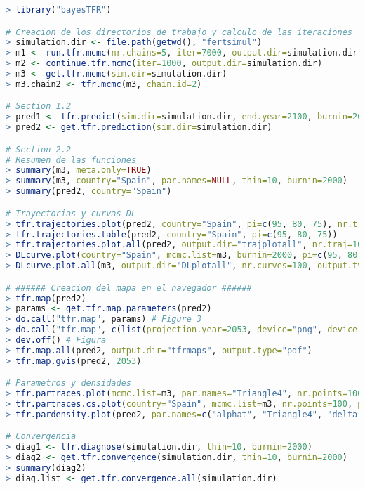 \begin{lstlisting}[language=R, caption=C\'odigo R para modelo de simulaci\'on de fertilidad correspondiente a la sección 2.2]
> library("bayesTFR")

# Creacion de los directorios de trabajo y calculo de las iteraciones
> simulation.dir <- file.path(getwd(), "fertsimul")
> m1 <- run.tfr.mcmc(nr.chains=5, iter=7000, output.dir=simulation.dir, seed=1) # el proceso de iteracion puede llevar varias horas
> m2 <- continue.tfr.mcmc(iter=1000, output.dir=simulation.dir)
> m3 <- get.tfr.mcmc(sim.dir=simulation.dir)
> m3.chain2 <- tfr.mcmc(m3, chain.id=2)

# Section 1.2
> pred1 <- tfr.predict(sim.dir=simulation.dir, end.year=2100, burnin=2000, nr.traj=3000, verbose=TRUE)
> pred2 <- get.tfr.prediction(sim.dir=simulation.dir)

# Section 2.2
# Resumen de las funciones
> summary(m3, meta.only=TRUE)
> summary(m3, country="Spain", par.names=NULL, thin=10, burnin=2000)
> summary(pred2, country="Spain")

# Trayectorias y curvas DL
> tfr.trajectories.plot(pred2, country="Spain", pi=c(95, 80, 75), nr.traj=100) # Figure 2 (left)
> tfr.trajectories.table(pred2, country="Spain", pi=c(95, 80, 75))
> tfr.trajectories.plot.all(pred2, output.dir="trajplotall", nr.traj=100, output.type="pdf", verbose=TRUE)
> DLcurve.plot(country="Spain", mcmc.list=m3, burnin=2000, pi=c(95, 80, 75), nr.curves=100) # Figure 2 (right)
> DLcurve.plot.all(m3, output.dir="DLplotall", nr.curves=100, output.type="pdf", burnin=2000, verbose=TRUE)

# ###### Creacion del mapa en el navegador ######
> tfr.map(pred2)
> params <- get.tfr.map.parameters(pred2)
> do.call("tfr.map", params) # Figure 3
> do.call("tfr.map", c(list(projection.year=2053, device="png", device.args=list(width=1000, file="worldTFR2053.png")), params)); 
> dev.off() # Figura 
> tfr.map.all(pred2, output.dir="tfrmaps", output.type="pdf")
> tfr.map.gvis(pred2, 2053)

# Parametros y densidades
> tfr.partraces.plot(mcmc.list=m3, par.names="Triangle4", nr.points=100) # Figure 5 (left)
> tfr.partraces.cs.plot(country="Spain", mcmc.list=m3, nr.points=100, par.names="Triangle_c4") # Figure 5 (right)
> tfr.pardensity.plot(pred2, par.names=c("alphat", "Triangle4", "delta", "sigma0"), dev.ncol=4, bw=0.05) # Figure 6

# Convergencia
> diag1 <- tfr.diagnose(simulation.dir, thin=10, burnin=2000)
> diag2 <- get.tfr.convergence(simulation.dir, thin=10, burnin=2000)
> summary(diag2)
> diag.list <- get.tfr.convergence.all(simulation.dir)


\end{lstlisting}
